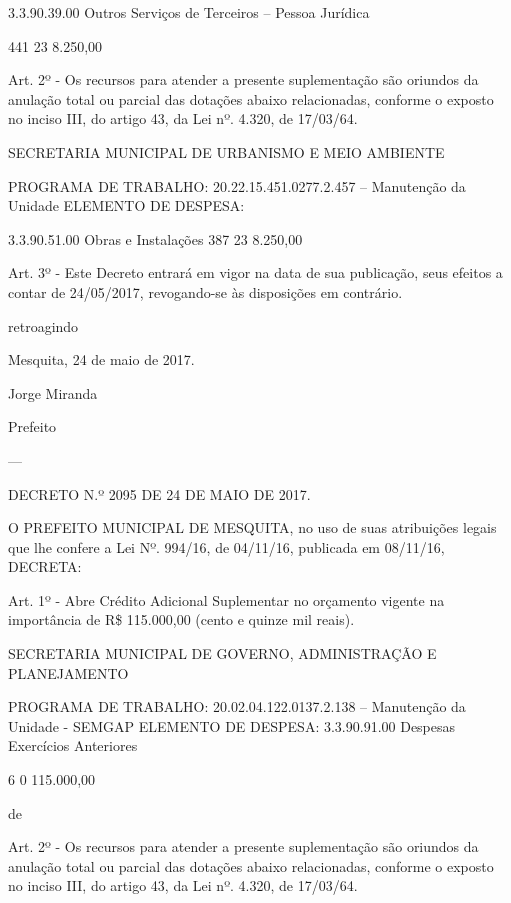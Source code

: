 \documentclass{doliberto}
\begin{document}
3.3.90.39.00  Outros  Serviços  de 
Terceiros  –  Pessoa 
Jurídica 

441  23  8.250,00 

 
 
 
Art. 2º - Os recursos para atender a presente suplementação 
são  oriundos  da  anulação  total  ou  parcial  das  dotações 
abaixo  relacionadas,  conforme  o  exposto  no  inciso  III,  do 
artigo 43, da Lei nº. 4.320, de 17/03/64. 
 
 
SECRETARIA  MUNICIPAL  DE  URBANISMO  E  MEIO 
AMBIENTE 
 
PROGRAMA DE TRABALHO: 
20.22.15.451.0277.2.457 – Manutenção da Unidade 
ELEMENTO DE DESPESA: 

3.3.90.51.00  Obras e Instalações  387  23  8.250,00 

 
 

 
Art.  3º  -  Este  Decreto  entrará  em  vigor  na  data  de  sua 
publicação, 
seus  efeitos  a  contar  de 
24/05/2017, revogando-se às disposições em contrário.  
 
 

retroagindo 

Mesquita, 24 de maio de 2017.  
 
Jorge Miranda 

Prefeito 

---

DECRETO N.º 2095 DE 24 DE MAIO DE 2017. 

 
 
O  PREFEITO  MUNICIPAL  DE  MESQUITA,  no  uso  de  suas 
atribuições  legais  que  lhe  confere  a  Lei  Nº.  994/16,  de 
04/11/16, publicada em 08/11/16, DECRETA: 
 
 
Art. 1º - Abre Crédito Adicional Suplementar no orçamento 
vigente na importância de R\$ 115.000,00 (cento e quinze mil 
reais). 
 
 
SECRETARIA  MUNICIPAL  DE  GOVERNO,  ADMINISTRAÇÃO 
E PLANEJAMENTO 
 
PROGRAMA DE TRABALHO: 
20.02.04.122.0137.2.138  –  Manutenção  da  Unidade  - 
SEMGAP 
ELEMENTO DE DESPESA: 
3.3.90.91.00  Despesas 
Exercícios 
Anteriores 

6  0  115.000,00 

de 
 
Art. 2º - Os recursos para atender a presente suplementação 
são  oriundos  da  anulação  total  ou  parcial  das  dotações 
abaixo  relacionadas,  conforme  o  exposto  no  inciso  III,  do 
artigo 43, da Lei nº. 4.320, de 17/03/64. 
 
\end{document}
